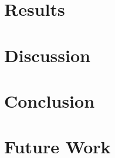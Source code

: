 \documentclass{article}
\begin{document}
\section{Results}

\section{Discussion}

\section{Conclusion}

\section{Future Work}




 
\end{document}
